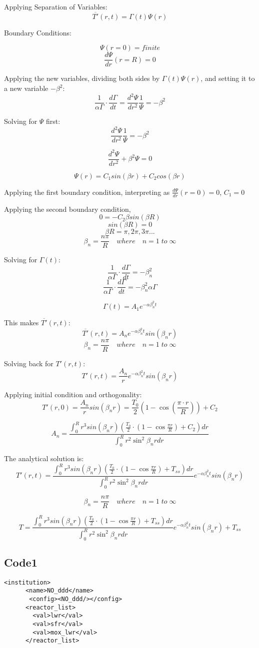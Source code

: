 \documentclass[12pt,letterpaper]{article}
\begin{document}
Applying Separation of Variables:
\[\overline{T'}(r,t) = \Gamma (t) \Psi (r)  \]

Boundary Conditions:

\[\Psi(r = 0) = finite \]
\[\frac{d\Psi}{dr} (r = R) = 0 \]

Applying the new variables, dividing both sides by $\Gamma (t) \Psi (r) $,
and setting it to a new variable $ -\beta^2 $:
\[\frac{1}{\alpha  \Gamma} \cdot \frac{d\Gamma}{dt} = \frac{d^2 \Psi}{dr^2} \frac{1}{\Psi} = -\beta^2 \] 

Solving for $\Psi$ first:
\[\frac{d^2 \Psi}{dr^2} \frac{1}{\Psi} = -\beta^2 \]

\[\frac{d^2 \Psi}{dr^2} + \beta^2 \Psi = 0 \]

\[\Psi (r) = C_1 sin(\beta r) + C_2 cos(\beta r) \]

Applying the first boundary condition,
interpreting as $\frac{d\Psi}{dr} (r = 0) = 0$, $C_1 = 0 $

Applying the second boundary condition,
\[0 =  -C_2 \beta sin(\beta R) \]
\[sin(\beta R) = 0  \]
\[\beta R = \pi, 2\pi, 3\pi ... \]
\[\beta_n = \frac{n\pi}{R} \quad where \quad n = 1 \; to \; \infty \]

Solving for $\Gamma(t)$:
\[\frac{1}{\alpha  \Gamma} \cdot \frac{d\Gamma}{dt} = -\beta_n^2 \]
\[\frac{1}{\alpha  \Gamma} \cdot \frac{d\Gamma}{dt} = -\beta_n^2 \alpha \Gamma \]

\[\Gamma(t) = A_1 e^{-\alpha \beta_n^2 t }\]

This makes $\overline{T'}(r,t)$:
\[\overline{T'}(r,t) = A_n e^{-\alpha \beta_n^2 t} sin(\beta_n r)\]
\[\beta_n = \frac{n\pi}{R} \quad where \quad n = 1 \; to \; \infty \]

Solving back for $T'(r,t)$:
\[T'(r,t) = \frac{A_n}{r} e^{-\alpha \beta_n^2 t} sin(\beta_n r)\]

Applying initial condition and orthogonality:
\[T'(r,0) = \frac{A_n}{r} sin(\beta_n r) = \frac{T_0}{2} (1-\cos{(\frac{\pi \cdot r}{R})}) + C_2\]

\[A_n = \frac{\int_{0}^{R}  r^3 sin(\beta_n r) (\frac{T_0}{2} \cdot (1-\cos{\frac{\pi r}{R}}) + C_2) dr} {\int_{0}^{R} r^2 \sin^2{\beta_n r} dr }\]

The analytical solution is:
\[T'(r,t) = \frac{\int_{0}^{R}  r^3 sin(\beta_n r) (\frac{T_0}{2} \cdot (1-\cos{\frac{\pi r}{R}}) + T_{ss}) dr} {\int_{0}^{R} r^2 \sin^2{\beta_n r} dr } e^{-\alpha \beta_n^2 t} sin(\beta_n r)\]

\[\beta_n = \frac{n\pi}{R} \quad where \quad n = 1 \; to \; \infty \]

\[T = \frac{\int_{0}^{R}  r^3 sin(\beta_n r) (\frac{T_0}{2} \cdot (1-\cos{\frac{\pi r}{R}}) + T_{ss}) dr} {\int_{0}^{R} r^2 \sin^2{\beta_n r} dr } e^{-\alpha \beta_n^2 t} sin(\beta_n r) + T_{ss} \]
\subsection{Code1}
\begin{verbatim}
<institution>
      <name>NO_ddd</name>
       <config><NO_ddd/></config>
      <reactor_list>
        <val>lwr</val>
        <val>sfr</val>
        <val>mox_lwr</val>
      </reactor_list>
\end{verbatim}
\end{document}
